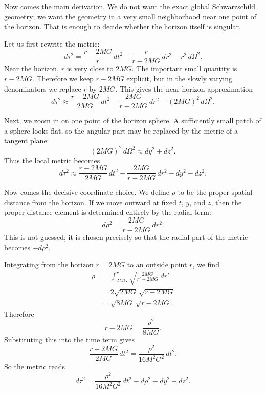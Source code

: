 Now comes the main derivation. We do not want the exact global Schwarzschild geometry; we want the geometry in a very small neighborhood near one point of the horizon. That is enough to decide whether the horizon itself is singular.

Let us first rewrite the metric:
\begin{equation}
d\tau^2
=
\frac{r-2MG}{r}\,dt^2
-
\frac{r}{r-2MG}\,dr^2
-
r^2\,d\Omega^2.
\end{equation}
Near the horizon, \(r\) is very close to \(2MG\). The important small quantity is \(r-2MG\). Therefore we keep \(r-2MG\) explicit, but in the slowly varying denominators we replace \(r\) by \(2MG\). This gives the near-horizon approximation
\begin{equation}
d\tau^2
\approx
\frac{r-2MG}{2MG}\,dt^2
-
\frac{2MG}{r-2MG}\,dr^2
-
(2MG)^2\,d\Omega^2.
\end{equation}

Next, we zoom in on one point of the horizon sphere. A sufficiently small patch of a sphere looks flat, so the angular part may be replaced by the metric of a tangent plane:
\begin{equation}
(2MG)^2\,d\Omega^2 \approx dy^2 + dz^2.
\end{equation}
Thus the local metric becomes
\begin{equation}
d\tau^2
\approx
\frac{r-2MG}{2MG}\,dt^2
-
\frac{2MG}{r-2MG}\,dr^2
-
dy^2
-
dz^2.
\end{equation}

Now comes the decisive coordinate choice. We define \(\rho\) to be the proper spatial distance from the horizon. If we move outward at fixed \(t\), \(y\), and \(z\), then the proper distance element is determined entirely by the radial term:
\begin{equation}
d\rho^2
=
\frac{2MG}{r-2MG}\,dr^2.
\end{equation}
This is not guessed; it is chosen precisely so that the radial part of the metric becomes \(-d\rho^2\).

Integrating from the horizon \(r=2MG\) to an outside point \(r\), we find
\begin{align}
\rho
&=
\int_{2MG}^{r}
\sqrt{\frac{2MG}{r'-2MG}}\,dr' \\
&=
2\sqrt{2MG}\,\sqrt{r-2MG} \\
&=
\sqrt{8MG}\,\sqrt{r-2MG}.
\end{align}
Therefore
\begin{equation}
r-2MG = \frac{\rho^2}{8MG}.
\end{equation}
Substituting this into the time term gives
\begin{equation}
\frac{r-2MG}{2MG}\,dt^2
=
\frac{\rho^2}{16M^2G^2}\,dt^2.
\end{equation}
So the metric reads
\begin{equation}
d\tau^2
=
\frac{\rho^2}{16M^2G^2}\,dt^2
-
d\rho^2
-
dy^2
-
dz^2.
\end{equation}

